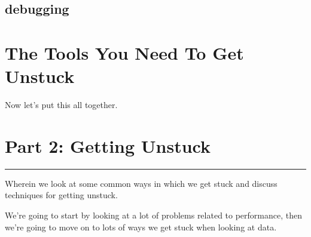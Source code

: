\documentclass[]{book}
\begin{document}
\section{debugging}\label{debugging}

\chapter{The Tools You Need To Get Unstuck}\label{the-tools}

Now let's put this all together.

\chapter*{Part 2: Getting Unstuck}\label{part2}

\begin{center}\rule{0.5\linewidth}{0.5pt}\end{center}

Wherein we look at some common ways in which we get stuck and discuss
techniques for getting unstuck.

We're going to start by looking at a lot of problems related to
performance, then we're going to move on to lots of ways we get stuck
when looking at data.


\end{document}
